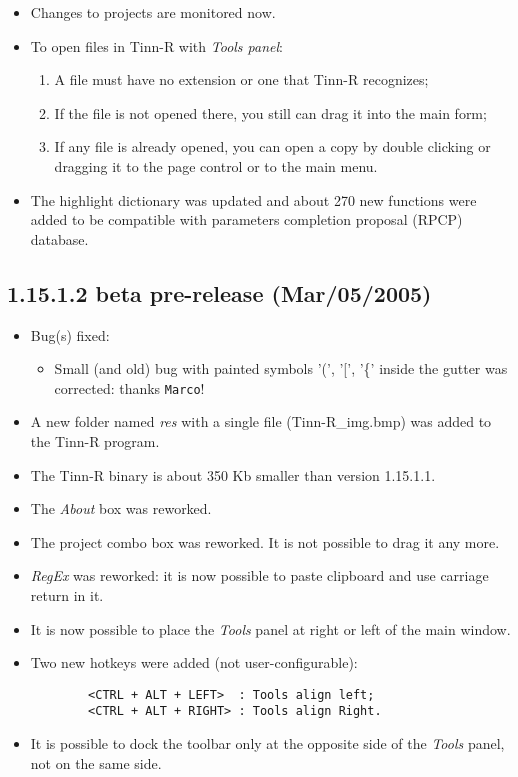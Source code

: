 \begin{itemize}
  \item Changes to projects are monitored now.
  \item To open files in Tinn-R with \textit{Tools panel}:
    \begin{enumerate}
      \item A file must have no extension or one that Tinn-R recognizes;
      \item If the file is not opened there, you still can drag it into the main form;
      \item If any file is already opened, you can open a copy by double clicking or dragging it
        to the page control or to the main menu.
    \end{enumerate}
  \item The \RR{} highlight dictionary was updated and about 270 new functions were added to be
    compatible with \RR{} parameters completion proposal (RPCP) database.
\end{itemize}


\subsection{1.15.1.2 beta pre-release (Mar/05/2005)}

\begin{itemize}
  \item Bug(s) fixed:
    \begin{itemize}
      \item Small (and old) bug with painted symbols '(', '[', '\{' inside the gutter was corrected: thanks \texttt{Marco}!
    \end{itemize}
  \item A new folder named \textit{res} with a single file (Tinn-R\_img.bmp) was added to the Tinn-R program.
  \item The Tinn-R binary is about 350 Kb smaller than version 1.15.1.1.
  \item The \textit{About} box was reworked.
  \item The project combo box was reworked. It is not possible to drag it any more.
  \item \textit{RegEx} was reworked: it is now possible to paste clipboard and use carriage return in it.
  \item It is now possible to place the \textit{Tools} panel at right or left of the main window.
  \item Two new hotkeys were added (not user-configurable):

    \begin{footnotesize}
      \begin{verbatim}
        <CTRL + ALT + LEFT>  : Tools align left;
        <CTRL + ALT + RIGHT> : Tools align Right.
      \end{verbatim}
    \end{footnotesize}

  \item It is possible to dock the \RR{} toolbar only at the opposite
    side of the \textit{Tools} panel, not on the same side.
\end{itemize}


